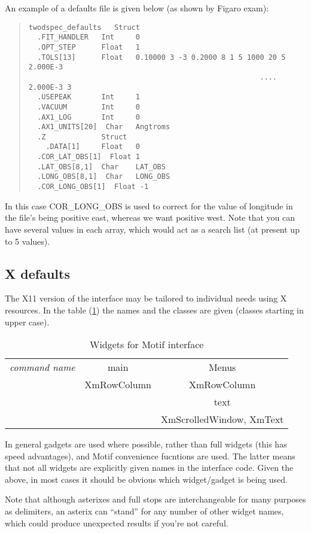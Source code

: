 An example of a defaults file is given below (as shown by Figaro exam):
\begin{quote}\begin{verbatim}
twodspec_defaults   Struct
  .FIT_HANDLER   Int     0
  .OPT_STEP      Float   1
  .TOLS[13]      Float   0.10000 3 -3 0.2000 8 1 5 1000 20 5 2.000E-3
                                                      .... 2.000E-3 3
  .USEPEAK       Int     1
  .VACUUM        Int     0
  .AX1_LOG       Int     0
  .AX1_UNITS[20]  Char   Angtroms
  .Z             Struct
    .DATA[1]     Float   0
  .COR_LAT_OBS[1]  Float 1
  .LAT_OBS[8,1]  Char    LAT_OBS
  .LONG_OBS[8,1]  Char   LONG_OBS
  .COR_LONG_OBS[1]  Float -1
\end{verbatim}\end{quote}
In this case COR\_LONG\_OBS is used to correct for the value of
longitude in the file's being positive east, whereas we want positive
west. Note that you can have several values in each array, which would
act as a search list (at present up to 5 values).

\subsection{X defaults}
\label{x-deflts}
The X11 version of the interface may be tailored to individual needs using
X resources. In the table (\ref{tb.motif}) the names and the classes
are given (classes starting in upper case).
\begin{table}
\small
\begin{tabular}{|c|c|c|}
\hline
{\it command name}& main        & Menus       \\
                  & XmRowColumn & XmRowColumn \\ \cline{3-3}
                  &             & text        \\
                  &             & XmScrolledWindow, XmText \\
\hline
\end{tabular}
\caption{Widgets for Motif interface}
\label{tb.motif}
\end{table}
In general gadgets are used where possible, rather than full widgets
(this has speed advantages), and Motif convenience fucntions are
used. The latter means that not all widgets are explicitly given names
in the interface code. Given the above, in most cases it should be
obvious which widget/gadget is being used.

Note that although asterixes and full stops are interchangeable for many
purposes as delimiters, an asterix can ``stand'' for any number of other
widget names, which could produce unexpected results if you're not careful.

